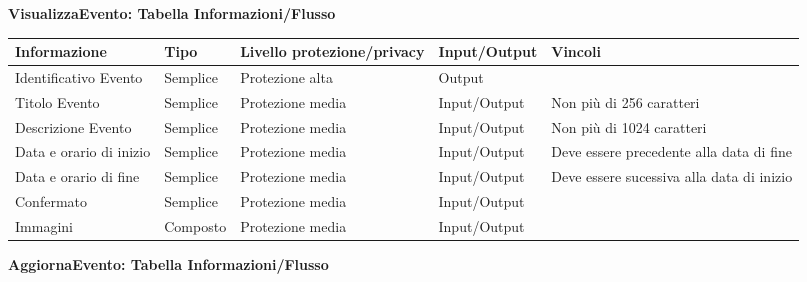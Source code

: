 \textbf{VisualizzaEvento: Tabella Informazioni/Flusso}
\hfill \break

\begin{tabular} {|P{3cm}|P{3cm}|P{3cm}|P{3cm}|P{3cm}|}
    \hline
    \textbf{Informazione}   & \textbf{Tipo} & \textbf{Livello protezione/privacy} & \textbf{Input/Output} & \textbf{Vincoli}                          \\
    \hline
    Identificativo Evento   & Semplice      & Protezione alta                     & Output                &                                           \\
    \hline
    Titolo Evento           & Semplice      & Protezione media                    & Input/Output          & Non più di 256 caratteri                  \\
    \hline
    Descrizione Evento      & Semplice      & Protezione media                    & Input/Output          & Non più di 1024 caratteri                 \\
    \hline
    Data e orario di inizio & Semplice      & Protezione media                    & Input/Output          & Deve essere precedente alla data di fine  \\
    \hline
    Data e orario di fine   & Semplice      & Protezione media                    & Input/Output          & Deve essere sucessiva alla data di inizio \\
    \hline
    Confermato              & Semplice      & Protezione media                    & Input/Output          &                                           \\
    \hline
    Immagini                & Composto      & Protezione media                    & Input/Output          &                                           \\
    \hline
\end{tabular}
\hfill \break

\textbf{AggiornaEvento: Tabella Informazioni/Flusso}
\hfill \break

